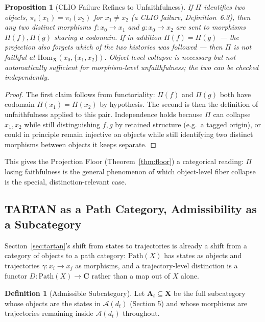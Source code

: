 \documentclass[11pt]{article}
\theoremstyle{plain}
\newtheorem{proposition}[theorem]{Proposition}
\theoremstyle{definition}
\newtheorem{definition}[theorem]{Definition}
\theoremstyle{remark}
\begin{document}
\begin{proposition}[CLIO Failure Refines to Unfaithfulness]
If $\Pi$ identifies two objects, $\pi_t(x_1) = \pi_t(x_2)$ for $x_1 \ne x_2$ (a CLIO failure, Definition~6.3), then any two distinct morphisms $f : x_0 \to x_1$ and $g : x_0 \to x_2$ are sent to morphisms $\Pi(f), \Pi(g)$ sharing a codomain. If in addition $\Pi(f) = \Pi(g)$ --- the projection also forgets which of the two histories was followed --- then $\Pi$ is not faithful at $\mathrm{Hom}_{\mathbf X}(x_0,\{x_1,x_2\})$. Object-level collapse is necessary but not automatically sufficient for morphism-level unfaithfulness; the two can be checked independently.
\end{proposition}
\begin{proof}
The first claim follows from functoriality: $\Pi(f)$ and $\Pi(g)$ both have codomain $\Pi(x_1) = \Pi(x_2)$ by hypothesis. The second is then the definition of unfaithfulness applied to this pair. Independence holds because $\Pi$ can collapse $x_1, x_2$ while still distinguishing $f,g$ by retained structure (e.g.\ a tagged origin), or could in principle remain injective on objects while still identifying two distinct morphisms between objects it keeps separate.
\end{proof}

This gives the Projection Floor (Theorem~\ref{thm:floor}) a categorical reading: $\Pi$ losing faithfulness is the general phenomenon of which object-level fiber collapse is the special, distinction-relevant case.

\subsection{TARTAN as a Path Category, Admissibility as a Subcategory}

Section~\ref{sec:tartan}'s shift from states to trajectories is already a shift from a category of objects to a path category: $\mathrm{Path}(X)$ has states as objects and trajectories $\gamma : x_i \to x_j$ as morphisms, and a trajectory-level distinction is a functor $D : \mathrm{Path}(X) \to \mathbf{C}$ rather than a map out of $X$ alone.

\begin{definition}[Admissible Subcategory]
Let $\mathbf{A}_t \subseteq \mathbf{X}$ be the full subcategory whose objects are the states in $\mathcal{A}(d_t)$ (Section 5) and whose morphisms are trajectories remaining inside $\mathcal{A}(d_t)$ throughout.
\end{definition}
\end{document}
